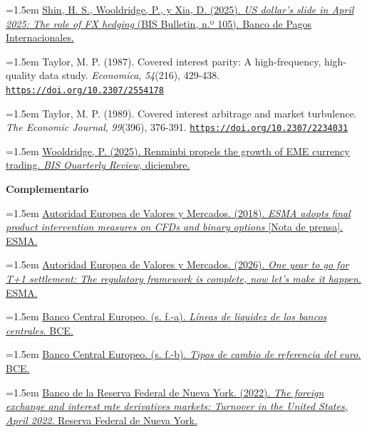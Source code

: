 \documentclass[10pt,a4paper]{article}
\begin{document}
\noindent\hangindent=1.5em \href{https://www.bis.org/publ/bisbull105.htm}{Shin, H. S., Wooldridge, P., y Xia, D. (2025). \textit{US dollar's slide in April 2025: The role of FX hedging} (BIS Bulletin, n.º 105). Banco de Pagos Internacionales.}

\noindent\hangindent=1.5em Taylor, M. P. (1987). Covered interest parity: A high-frequency, high-quality data study. \textit{Economica}, \textit{54}(216), 429-438. \href{https://doi.org/10.2307/2554178}{\nolinkurl{https://doi.org/10.2307/2554178}}

\noindent\hangindent=1.5em Taylor, M. P. (1989). Covered interest arbitrage and market turbulence. \textit{The Economic Journal}, \textit{99}(396), 376-391. \href{https://doi.org/10.2307/2234031}{\nolinkurl{https://doi.org/10.2307/2234031}}

\noindent\hangindent=1.5em \href{https://www.bis.org/publ/qtrpdf/r_qt2512w.htm}{Wooldridge, P. (2025). Renminbi propels the growth of EME currency trading. \textit{BIS Quarterly Review}, diciembre.}

\textbf{Complementario}

\noindent\hangindent=1.5em \href{https://www.esma.europa.eu/press-news/esma-news/esma-adopts-final-product-intervention-measures-cfds-and-binary-options}{Autoridad Europea de Valores y Mercados. (2018). \textit{ESMA adopts final product intervention measures on CFDs and binary options} [Nota de prensa]. ESMA.}

\noindent\hangindent=1.5em \href{https://www.esma.europa.eu/node/235946}{Autoridad Europea de Valores y Mercados. (2026). \textit{One year to go for T+1 settlement: The regulatory framework is complete, now let's make it happen}. ESMA.}

\noindent\hangindent=1.5em \href{https://www.ecb.europa.eu/mopo/international-market-operations/liquidity_lines/html/index.es.html}{Banco Central Europeo. (s. f.-a). \textit{Líneas de liquidez de los bancos centrales}. BCE.}

\noindent\hangindent=1.5em \href{https://www.ecb.europa.eu/stats/policy_and_exchange_rates/euro_reference_exchange_rates/html/index.es.html}{Banco Central Europeo. (s. f.-b). \textit{Tipos de cambio de referencia del euro}. BCE.}

\noindent\hangindent=1.5em \href{https://www.newyorkfed.org/medialibrary/media/markets/triennial/2022/2022triennialreport.pdf}{Banco de la Reserva Federal de Nueva York. (2022). \textit{The foreign exchange and interest rate derivatives markets: Turnover in the United States, April 2022}. Reserva Federal de Nueva York.}
\end{document}
